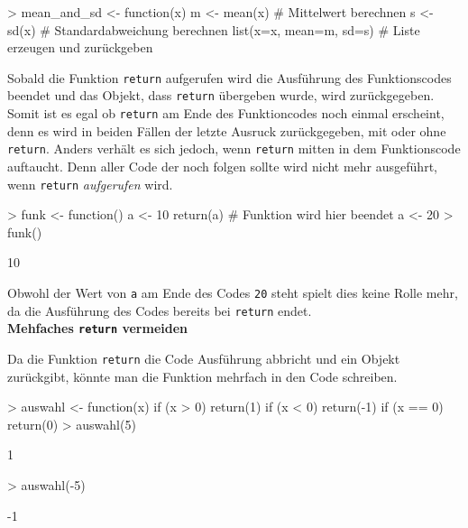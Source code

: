 \documentclass[12pt, a4paper,twoside,openany,x11names,svgnames]{memoir}
\begin{document}
\begin{Schunk}
\begin{Sinput}
> mean_and_sd <- function(x) {
   m <- mean(x)                      # Mittelwert berechnen
   s <- sd(x)                        # Standardabweichung berechnen
   list(x=x, mean=m, sd=s)           # Liste erzeugen und zurückgeben
 }
\end{Sinput}
\end{Schunk}

Sobald die Funktion \texttt{return} aufgerufen wird die Ausführung des Funktionscodes beendet und das Objekt, dass \texttt{return} übergeben wurde, wird zurückgegeben. Somit ist es egal ob \texttt{return} am Ende des Funktioncodes noch einmal erscheint, denn es wird in beiden Fällen der letzte Ausruck zurückgegeben, mit oder ohne \texttt{return}. Anders verhält es sich jedoch, wenn \texttt{return} mitten in dem Funktionscode auftaucht. Denn aller Code der noch folgen sollte wird nicht mehr ausgeführt, wenn \texttt{return} \emph{aufgerufen} wird.

\begin{Schunk}
\begin{Sinput}
> funk <- function() {
   a <- 10
   return(a)               # Funktion wird hier beendet
   a <- 20
 }
> funk()
\end{Sinput}
\begin{Soutput}
[1] 10
\end{Soutput}
\end{Schunk}

Obwohl der Wert von \texttt{a} am Ende des Codes \texttt{20} steht spielt dies keine Rolle mehr, da die Ausführung des Codes bereits bei \texttt{return} endet.  \\


\textbf{Mehfaches \texttt{return} vermeiden}

Da die Funktion \texttt{return} die Code Ausführung abbricht und ein Objekt zurückgibt, könnte man die Funktion mehrfach in den Code schreiben.

\begin{Schunk}
\begin{Sinput}
> auswahl <- function(x) {
   if (x > 0)
     return(1)
   if (x < 0)
     return(-1)
   if (x == 0)
     return(0)
 }
> auswahl(5)
\end{Sinput}
\begin{Soutput}
[1] 1
\end{Soutput}
\begin{Sinput}
> auswahl(-5)
\end{Sinput}
\begin{Soutput}
[1] -1
\end{Soutput}
\end{Schunk}
\end{document}
